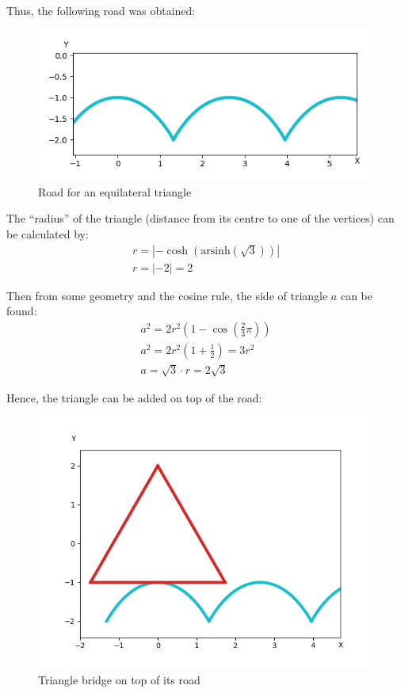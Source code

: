 \documentclass[12pt]{article}
\begin{document}
        Thus, the following road was obtained:
        \begin{figure}[H]
            \centering
            \includegraphics[width=\linewidth]{images/triangle_road.png}
            \caption{Road for an equilateral triangle}
        \end{figure}

        The ``radius'' of the triangle (distance from its centre to one of the vertices) can be calculated by:
        \begin{align}
            r = | -\cosh( \text{arsinh}(\sqrt{3}) ) | \\
            r = | -2 | = 2
        \end{align}

        Then from some geometry and the cosine rule, the side of triangle $a$ can be found:
        \begin{align}
            a^2 = 2r^2 (1 - \cos(\frac{2}{3}\pi)) \\
            a^2 = 2r^2 (1 + \frac{1}{2}) = 3r^2 \\
            a = \sqrt{3} \cdot r = 2\sqrt{3}
        \end{align}

        Hence, the triangle can be added on top of the road:
        \begin{figure}[H]
            \centering
            \includegraphics[width=0.8\linewidth]{images/tirangle_road_with.png}
            \caption{Triangle bridge on top of its road}
        \end{figure}
\end{document}
